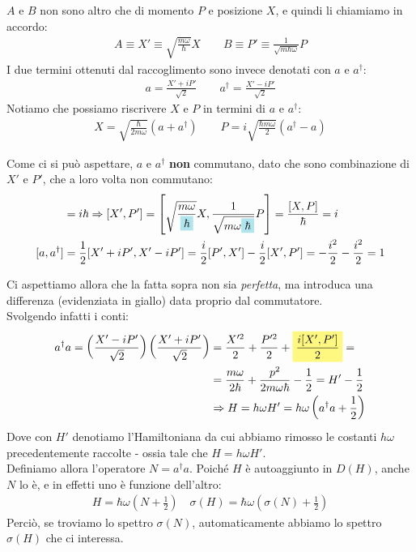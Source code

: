 \documentclass[../../FisicaTeorica.tex]{subfiles}
\begin{document}
$A$ e $B$ non sono altro che  di momento $P$ e posizione $X$, e quindi li chiamiamo in accordo:
\begin{align*}
A\equiv X' \equiv \sqrt{\frac{m\omega}{\hbar}}X \qquad
B\equiv P' \equiv \frac{1}{\sqrt{m\hbar \omega}}P 
\end{align*}
I due termini ottenuti dal raccoglimento sono invece denotati con $a$ e $a^\dag$:
\begin{align*}
a=\frac{X'+iP'}{\sqrt{2}} \qquad a^\dag = \frac{X'-iP'}{\sqrt{2}}
\end{align*}
Notiamo che possiamo riscrivere $X$ e $P$ in termini di $a$ e $a^\dag$:
\begin{align*}
X = \sqrt{\frac{\hbar}{2m\omega}}(a+a^\dag) \qquad P = i\sqrt{\frac{\hbar m\omega}{2}}(a^\dag-a)
\end{align*}

Come ci si può aspettare, $a$ e $a^\dag$ \textbf{non} commutano, dato che sono combinazione di $X'$ e $P'$, che a loro volta non commutano:
\begin{align*}
[X,P]&=i\hbar \Rightarrow  [X',P']=
\left[\sqrt{\frac{m\omega}{\hlc{SkyBlue}{\hbar}}}X,\frac{1}{\sqrt{m\omega\hlc{SkyBlue}{\hbar}}}P\right]= \frac{[X,P]}{\hbar}=
i\\
[a,a^\dag]&=\frac{1}{2}[X'+iP', X'-iP'] = \frac{i}{2}[P',X']-\frac{i}{2}[X',P']=-\frac{i^2}{2}-\frac{i^2}{2}=1
\end{align*}

Ci aspettiamo allora che la  fatta sopra non sia \textit{perfetta}, ma introduca una differenza (evidenziata in giallo) data proprio dal commutatore.\\
Svolgendo infatti i conti:
\begin{align*}
a^\dag a=\left(\frac{X'-iP'}{\sqrt{2}}\right)\left(\frac{X'+iP'}{\sqrt{2}}\right) &= \frac{X'^2}{2}+\frac{P'^2}{2}+\hlc{Yellow}{\frac{i[X',P']}{2}}=\\
&=\frac{m\omega}{2\hbar} + \frac{p^2}{2m\omega\hbar}-\frac{1}{2} = H'-\frac{1}{2}\\
&\Rightarrow H =h\omega H' =h\omega\left(a^\dag a + \frac{1}{2}\right)
\end{align*}
Dove con $H'$ denotiamo l'Hamiltoniana da cui abbiamo rimosso le costanti $h\omega$ precedentemente raccolte - ossia tale che $H=h\omega H'$.\\

Definiamo allora l'operatore $N = a^\dag a$. Poiché $H$ è autoaggiunto in $D(H)$, anche $N$ lo è, e in effetti uno è funzione dell'altro:
\begin{align}
H=\hbar \omega \left(N+\frac{1}{2}\right) \quad \sigma(H) = \hbar \omega\left(\sigma(N)+\frac{1}{2}\right)
\label{eqn:relazione_spettrale}
\end{align}
Perciò, se troviamo lo spettro $\sigma(N)$, automaticamente abbiamo lo spettro $\sigma(H)$ che ci interessa.\\
\end{document}
